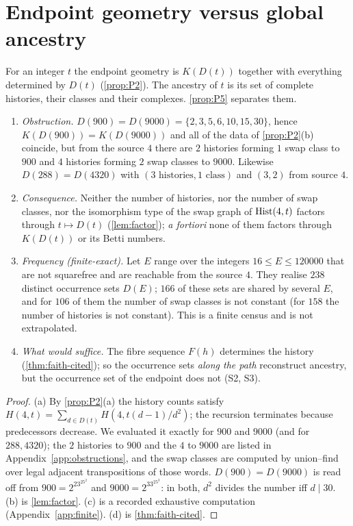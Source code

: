 \section{Endpoint geometry versus global ancestry}\label{sec:endpoint}
For an integer $t$ the endpoint geometry is $K(D(t))$ together with everything determined by $D(t)$ (\cref{prop:P2}). The ancestry of $t$ is its set of complete histories, their classes and their complexes. \cref{prop:P5} separates them.
\begin{proposition}\label{prop:P5}
\begin{enumerate}[label=(\alph*),itemsep=1pt]
\item \emph{Obstruction.} $D(900)=D(9000)=\{2,3,5,6,10,15,30\}$, hence $K(D(900))=K(D(9000))$ and all of the data of \cref{prop:P2}(b) coincide, but from the source $4$ there are $2$ histories forming $1$ swap class to $900$ and $4$ histories forming $2$ swap classes to $9000$. Likewise $D(288)=D(4320)$ with $(3\text{ histories},1\text{ class})$ and $(3,2)$ from source $4$.
\item \emph{Consequence.} Neither the number of histories, nor the number of swap classes, nor the isomorphism type of the swap graph of $\mathrm{Hist}(4,t)$ factors through $t\mapsto D(t)$ (\cref{lem:factor}); \emph{a fortiori} none of them factors through $K(D(t))$ or its Betti numbers.
\item \emph{Frequency (finite-exact).} Let $E$ range over the integers $16\le E\le120000$ that are not squarefree and are reachable from the source $4$. They realise $238$ distinct occurrence sets $D(E)$; $166$ of these sets are shared by several $E$, and for $106$ of them the number of swap classes is not constant (for $158$ the number of histories is not constant). This is a finite census and is not extrapolated.
\item \emph{What would suffice.} The fibre sequence $F(h)$ determines the history (\cref{thm:faith-cited}); so the occurrence sets \emph{along the path} reconstruct ancestry, but the occurrence set of the endpoint does not (S2, S3).
\end{enumerate}
\end{proposition}
\begin{proof}
(a) By \cref{prop:P2}(a) the history counts satisfy $H(4,t)=\sum_{d\in D(t)}H(4,t(d-1)/d^2)$; the recursion terminates because predecessors decrease. We evaluated it exactly for $900$ and $9000$ (and for $288,4320$); the $2$ histories to $900$ and the $4$ to $9000$ are listed in Appendix~\ref{app:obstructions}, and the swap classes are computed by union--find over legal adjacent transpositions of those words. $D(900)=D(9000)$ is read off from $900=2^23^25^2$ and $9000=2^33^25^3$: in both, $d^2$ divides the number iff $d\mid30$. (b) is \cref{lem:factor}. (c) is a recorded exhaustive computation (Appendix~\ref{app:finite}). (d) is \cref{thm:faith-cited}.
\end{proof}

